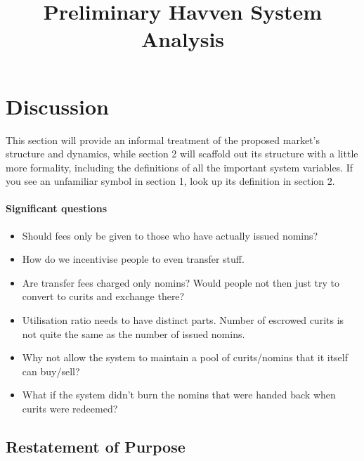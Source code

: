 \documentclass{article}
\begin{document}
\newcommand{\CUR}{\textsc{cur}}
\newcommand{\NOM}{\textsc{nom}}


\title{Preliminary Havven System Analysis}
\date{}

\begin{figure}
    \centering
    
\end{figure}
\maketitle

\section{Discussion}

This section will provide an informal treatment of the proposed market's structure
and dynamics, while section 2 will scaffold out its structure with a little more
formality, including the definitions of all the important system variables.
If you see an unfamiliar symbol in section 1, look up its definition in section 2.

\paragraph{Significant questions}
\begin{itemize}
    \item Should fees only be given to those who have actually issued nomins?
    \item How do we incentivise people to even transfer stuff.
    \item Are transfer fees charged only nomins? Would people not then just try to convert to curits and exchange there?
    \item Utilisation ratio needs to have distinct parts. Number of escrowed curits is not quite the same as the number of issued nomins.
    \item Why not allow the system to maintain a pool of curits/nomins that it itself can buy/sell?
    \item What if the system didn't burn the nomins that were handed back when curits were redeemed?
\end{itemize}

\pagebreak
\subsection{Restatement of Purpose}
\end{document}
